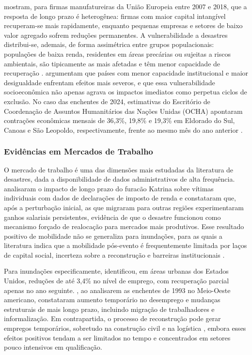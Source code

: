 \documentclass[a4paper,12pt]{article}
\begin{document}
 mostram, para firmas manufatureiras da União Europeia entre
2007 e 2018, que a resposta de longo prazo é heterogênea: firmas com maior capital
intangível recuperam-se mais rapidamente, enquanto pequenas empresas e setores de baixo
valor agregado sofrem reduções permanentes. A vulnerabilidade a desastres distribui-se,
ademais, de forma assimétrica entre grupos populacionais: populações de baixa renda,
residentes em áreas precárias ou sujeitas a riscos ambientais, são tipicamente as mais
afetadas e têm menor capacidade de recuperação \cite{alderman2012, lima2018}.
 argumentam que países com menor capacidade institucional e
maior desigualdade enfrentam efeitos mais severos, e que essa vulnerabilidade
socioeconômica não apenas agrava os impactos imediatos como perpetua ciclos de
exclusão. No caso das enchentes de 2024, estimativas do Escritório de Coordenação de Assuntos
Humanitários das Nações Unidas (OCHA) apontaram contrações econômicas mensais de
36,3\%, 19,8\% e 19,3\% em Eldorado do Sul, Canoas e São Leopoldo, respectivamente,
frente ao mesmo mês do ano anterior \cite{ocha2024}.

\subsubsection{Evidências em Mercados de Trabalho}

O mercado de trabalho é uma das dimensões mais estudadas da literatura de desastres,
dada a disponibilidade de dados administrativos de alta frequência.
 analisaram o impacto de longo prazo do furacão Katrina sobre
vítimas individuais com dados de declarações de imposto de renda e constataram que, após
a perturbação inicial, as que migraram para outras regiões experimentaram ganhos salariais
persistentes, evidência de que o desastre funcionou como mecanismo forçado de
realocação para mercados mais produtivos. Esse resultado positivo de mobilidade não se
generaliza para inundações, para as quais a literatura indica que a mobilidade pós-evento
é frequentemente limitada por laços de capital social, incerteza sobre a reconstrução e
barreiras institucionais \cite{botzen2019}.

Para inundações especificamente,  identificou, em áreas
urbanas dos Estados Unidos, reduções de até 3,4\% no nível de emprego, com recuperação
parcial apenas no ano seguinte. , ao analisarem as enchentes de 1993
no Meio-Oeste americano, constataram aumento temporário no desemprego e mudanças
estruturais de mais longo prazo, incluindo migração de trabalhadores e informalização.
Em contrapartida, o processo de reconstrução pode gerar empregos temporários, sobretudo
na construção civil e na logística \cite{du2010}, embora esses efeitos positivos tendam a
ser limitados no tempo e concentrados em setores pouco intensivos em qualificação.
\end{document}
